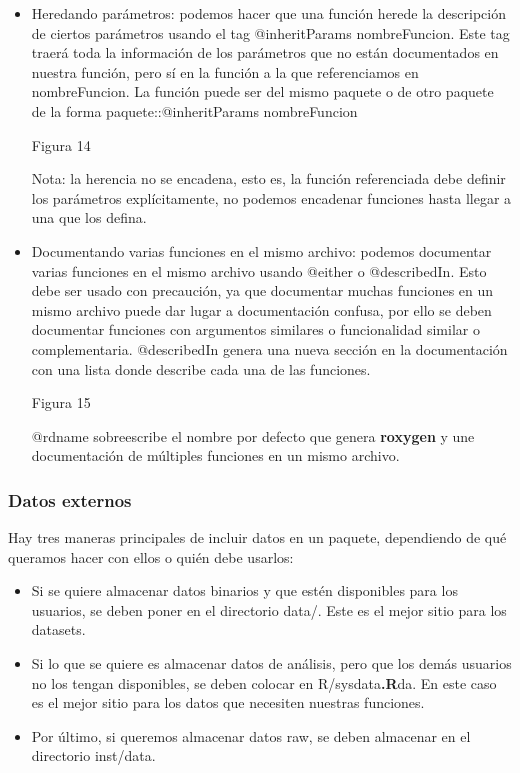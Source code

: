 \begin{itemize}
    \item Heredando par\'ametros: podemos hacer que una funci\'on herede la descripci\'on de
ciertos par\'ametros usando el tag @inheritParams nombreFuncion. Este tag traer\'a
toda la informaci\'on de los par\'ametros que no est\'an documentados en nuestra funci\'on,
pero s\'i en la funci\'on a la que referenciamos en nombreFuncion.
La funci\'on puede ser del mismo paquete o de otro paquete de la forma
paquete::@inheritParams nombreFuncion

Figura 14

Nota: la herencia no se encadena, esto es, la funci\'on referenciada debe definir los
par\'ametros expl\'icitamente, no podemos encadenar funciones hasta llegar a una que
los defina.
    \item Documentando varias funciones en el mismo archivo: podemos documentar
varias funciones en el mismo archivo usando @either o @describedIn. Esto debe ser
usado con precauci\'on, ya que documentar muchas funciones en un mismo archivo
puede dar lugar a documentaci\'on confusa, por ello se deben documentar funciones
con argumentos similares o funcionalidad similar o complementaria.
@describedIn genera una nueva secci\'on en la documentaci\'on con una lista donde
describe cada una de las funciones.

Figura 15

@rdname sobreescribe el nombre por defecto que genera \textbf{roxygen} y une
documentaci\'on de m\'ultiples funciones en un mismo archivo.
\end{itemize}

\subsubsection{Datos externos}

Hay tres maneras principales de incluir datos en un paquete, dependiendo de qu\'e queramos
hacer con ellos o qui\'en debe usarlos:

\begin{itemize}
    \item Si se quiere almacenar datos binarios y que est\'en disponibles para los usuarios, se
deben poner en el directorio data/. Este es el mejor sitio para los datasets.
    \item Si lo que se quiere es almacenar datos de an\'alisis, pero que los dem\'as usuarios no
los tengan disponibles, se deben colocar en R/sysdata\textbf{.R}da. En este caso es el mejor
sitio para los datos que necesiten nuestras funciones.
    \item Por \'ultimo, si queremos almacenar datos raw, se deben almacenar en el directorio
inst/data.
\end{itemize}

